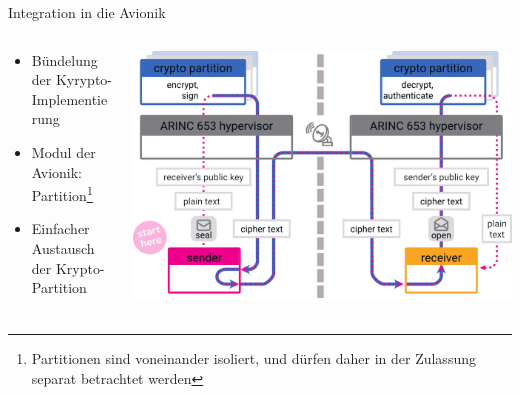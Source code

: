 \begin{frame}[c]{Integration in die Avionik}
  \begin{columns}[fullwidth,c]
    \begin{column}{.4\linewidth}
      \begin{itemize}
        \item Bündelung der Kyrypto-Implementierung
        \item Modul der Avionik: Partition\footnote{Partitionen sind voneinander isoliert, und dürfen daher in der Zulassung separat betrachtet werden}
        \item Einfacher Austausch der Krypto-Partition
      \end{itemize}
      \vspace{8.5em} %
    \end{column}%
    \begin{column}{.6\linewidth}
      \includegraphics[width=\linewidth]{graphics/crypto partition}
    \end{column}
  \end{columns}
\end{frame}








